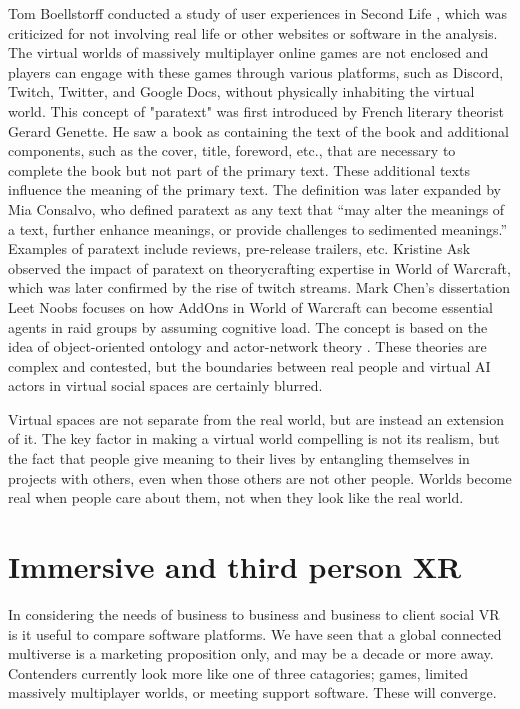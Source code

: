 Tom Boellstorff conducted a study of user experiences in Second Life \cite{serapis2008coming}, which was criticized for not involving real life or other websites or software in the analysis. The virtual worlds of massively multiplayer online games are not enclosed and players can engage with these games through various platforms, such as Discord, Twitch, Twitter, and Google Docs, without physically inhabiting the virtual world. This concept of "paratext" was first introduced by French literary theorist Gerard Genette. He saw a book as containing the text of the book and additional components, such as the cover, title, foreword, etc., that are necessary to complete the book but not part of the primary text. These additional texts influence the meaning of the primary text. The definition was later expanded by Mia Consalvo, who defined paratext as any text that ``may alter the meanings of a text, further enhance meanings, or provide challenges to sedimented meanings.'' Examples of paratext include reviews, pre-release trailers, etc. Kristine Ask observed the impact of paratext on theorycrafting expertise in World of Warcraft, which was later confirmed by the rise of twitch streams. Mark Chen's dissertation Leet Noobs focuses on how AddOns in World of Warcraft can become essential agents in raid groups by assuming cognitive load. The concept is based on the idea of object-oriented ontology and actor-network theory \cite{cole2013call}. These theories are complex and contested, but the boundaries between real people and virtual AI actors in virtual social spaces are certainly blurred. \par
Virtual spaces are not separate from the real world, but are instead an extension of it. The key factor in making a virtual world compelling is not its realism, but the fact that people give meaning to their lives by entangling themselves in projects with others, even when those others are not other people. Worlds become real when people care about them, not when they look like the real world.
\section{Immersive and third person XR}
In considering the needs of business to business and business to client social VR is it useful to compare software platforms. We have seen that a global connected multiverse is a marketing proposition only, and may be a decade or more away. Contenders currently look more like one of three catagories; games, limited massively multiplayer worlds, or meeting support software. These will converge.
